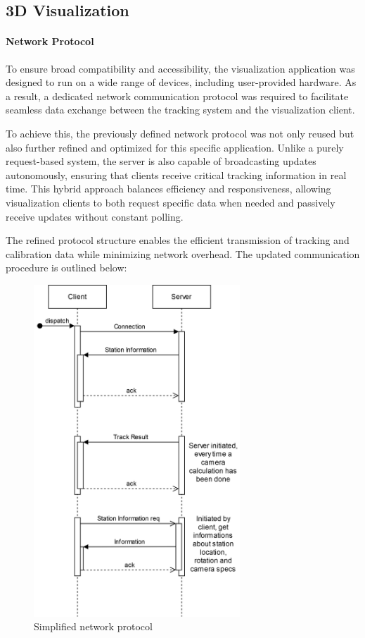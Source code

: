 
\subsection{3D Visualization}
\paragraph{Network Protocol}  
To ensure broad compatibility and accessibility, the visualization application was designed to run on a wide range of devices, including user-provided hardware. As a result, a dedicated network communication protocol was required to facilitate seamless data exchange between the tracking system and the visualization client.  

To achieve this, the previously defined network protocol was not only reused but also further refined and optimized for this specific application. Unlike a purely request-based system, the server is also capable of broadcasting updates autonomously, ensuring that clients receive critical tracking information in real time. This hybrid approach balances efficiency and responsiveness, allowing visualization clients to both request specific data when needed and passively receive updates without constant polling.  

The refined protocol structure enables the efficient transmission of tracking and calibration data while minimizing network overhead. The updated communication procedure is outlined below:  

\begin{figure}[H]
	\centering
	\hspace*{-1.5cm}
	\includegraphics[width=220pt]{figures/SS_Protocol}
	\caption{Simplified network protocol}
	\label{fig:ssprotocol}
\end{figure}

